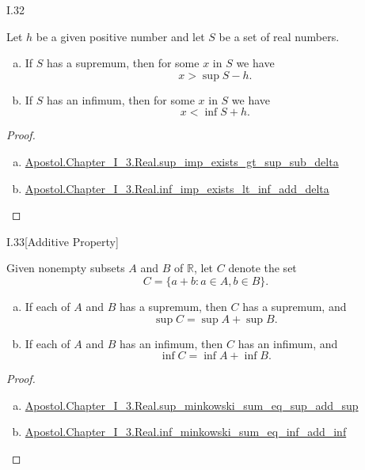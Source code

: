 \documentclass{article}
\begin{document}
\begin{xtheorem}{I.32}

  Let $h$ be a given positive number and let $S$ be a set of real numbers.
  \begin{enumerate}[(a)]
    \item If $S$ has a supremum, then for some $x$ in $S$ we have
      $$x > \sup{S} - h.$$
    \item If $S$ has an infimum, then for some $x$ in $S$ we have
      $$x < \inf{S} + h.$$
  \end{enumerate}

\end{xtheorem}

\begin{proof}

  \  %

  \begin{enumerate}[(a)]
    \item \href{Chapter_I_3.lean}{Apostol.Chapter_I_3.Real.sup_imp_exists_gt_sup_sub_delta}
    \item \href{Chapter_I_3.lean}{Apostol.Chapter_I_3.Real.inf_imp_exists_lt_inf_add_delta}
  \end{enumerate}

\end{proof}

\begin{xtheorem}{I.33}[Additive Property]

  Given nonempty subsets $A$ and $B$ of $\mathbb{R}$, let $C$ denote the set
  $$C = \{a + b : a \in A, b \in B\}.$$

  \begin{enumerate}[(a)]
    \item If each of $A$ and $B$ has a supremum, then $C$ has a supremum, and
      $$\sup{C} = \sup{A} + \sup{B}.$$
    \item If each of $A$ and $B$ has an infimum, then $C$ has an infimum, and
      $$\inf{C} = \inf{A} + \inf{B}.$$
  \end{enumerate}

\end{xtheorem}

\begin{proof}

  \  %

  \begin{enumerate}[(a)]
    \item \href{Chapter_I_3.lean}{Apostol.Chapter_I_3.Real.sup_minkowski_sum_eq_sup_add_sup}
    \item \href{Chapter_I_3.lean}{Apostol.Chapter_I_3.Real.inf_minkowski_sum_eq_inf_add_inf}
  \end{enumerate}

\end{proof}
\end{document}
